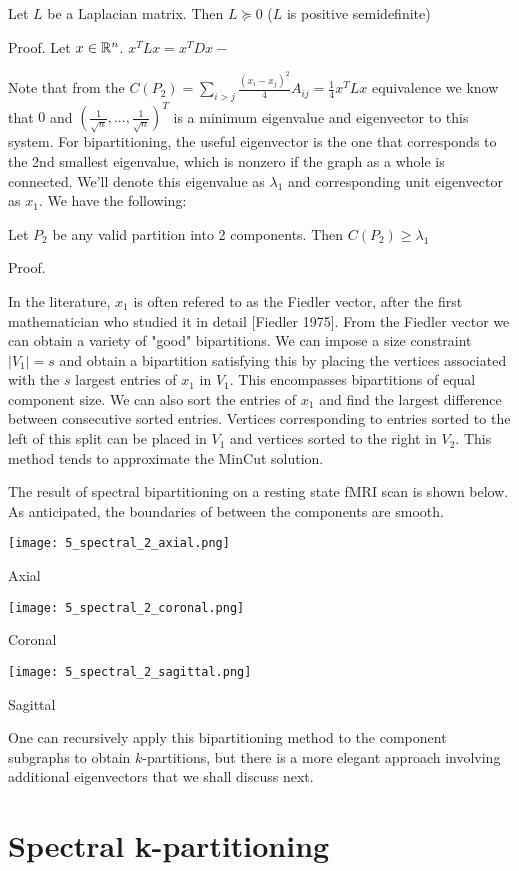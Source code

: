 \begin{theorem} \label{Laplacian_psd}
Let $L$ be a Laplacian matrix. Then $L \succeq 0$
($L$ is positive semidefinite)

Proof. Let $x \in \mathbb{R}^n$. $x^T L x = x^T D x - $
\end{theorem}

Note that from the
$C(P_2) = \sum_{i > j} \frac{(x_i - x_j)^2}{4} A_{ij}
        = \frac{1}{4} x^T L x$ equivalence we know that
$0$ and $(\frac{1}{\sqrt{n}}, ..., \frac{1}{\sqrt{n}})^T$ is a minimum
eigenvalue and eigenvector to this system. For bipartitioning, the
useful eigenvector is the one that corresponds to the 2nd smallest
eigenvalue, which is nonzero if the graph as a whole is connected.
We'll denote this eigenvalue as $\lambda_1$ and corresponding unit
eigenvector as $x_1$. We have the following:

\begin{theorem}
Let $P_2$ be any valid partition into 2 components. Then
$C(P_2) \geq \lambda_1$

Proof.
\end{theorem}

In the literature, $x_1$ is often refered to as the Fiedler vector,
after the first mathematician who studied it in detail [Fiedler 1975].
From the Fiedler vector we can obtain a variety of "good" bipartitions.
We can impose a size constraint $|V_1| = s$ and obtain a bipartition
satisfying this by placing the vertices associated with the $s$ largest
entries of $x_1$ in $V_1$. This encompasses bipartitions of equal
component size. We can also sort the entries of $x_1$ and find the
largest difference between consecutive sorted entries. Vertices
corresponding to entries sorted to the left of this split can be placed
in $V_1$ and vertices sorted to the right in $V_2$. This method tends to
approximate the MinCut solution.

The result of spectral bipartitioning on a resting state fMRI scan
is shown below. As anticipated, the boundaries of between the
components are smooth.

\begin{center}
\texttt{[image: 5\_spectral\_2\_axial.png]}

Axial

\texttt{[image: 5\_spectral\_2\_coronal.png]}

Coronal

\texttt{[image: 5\_spectral\_2\_sagittal.png]}

Sagittal
\end{center}

One can recursively apply this bipartitioning method to the component
subgraphs to obtain $k$-partitions, but there is a more elegant
approach involving additional eigenvectors that we shall discuss next.

\section{Spectral k-partitioning}



